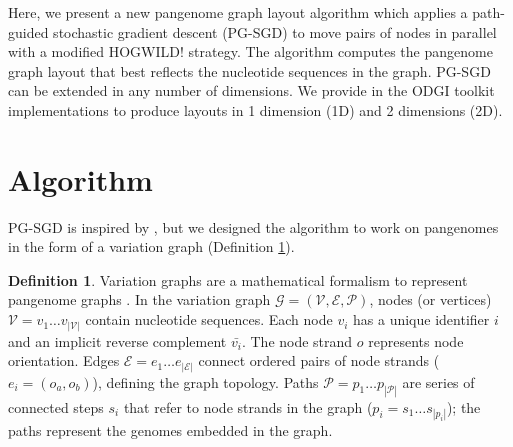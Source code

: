 \documentclass{bioinfo}
\theoremstyle{definition}
\newtheorem{definition}{Definition}[section]
\newcommand{\red}[1]{{\textcolor{Red}{#1}}}
\newcommand{\FIXME}[1]{\red{[FIXME: #1]}}
\begin{document}
	Here, we present a new pangenome graph layout algorithm which applies a path-guided stochastic gradient descent (PG-SGD) to move pairs of nodes in parallel with a modified HOGWILD! strategy.
	The algorithm computes the pangenome graph layout that best reflects the nucleotide sequences in the graph.
	PG-SGD can be extended in any number of dimensions. We provide in the ODGI toolkit \citep{Guarracino2022} implementations to produce layouts in 1 dimension (1D) and 2 dimensions (2D).

	\section{Algorithm}
	
	PG-SGD is inspired by \cite{Zheng2019}, but we designed the algorithm to work on pangenomes in the form of a variation graph (Definition \ref{def:vg}).
	
	\begin{definition}
		\label{def:vg}
		Variation graphs are a mathematical formalism to represent pangenome graphs \citep{Garrison_2019_thesis}.
		In the variation graph $\mathcal{G} = (\mathcal{V}, \mathcal{E}, \mathcal{P})$, nodes (or vertices) $\mathcal{V} = v_1\ldots v_{|\mathcal{V}|}$ contain nucleotide sequences.
		Each node $v_i$ has a unique identifier $i$ and an implicit reverse complement $\bar{v_i}$.
		The node strand $o$ represents node orientation.
		Edges $\mathcal{E} = e_1\ldots e_{|\mathcal{E}|}$ connect ordered pairs of node strands ($e_i = ( o_a, o_b )$), defining the graph topology.
		Paths $\mathcal{P} = p_1\ldots p_{|\mathcal{P}|}$ are series of connected steps $s_i$ that refer to node strands in the graph ($p_i = s_1 \ldots s_{|p_i|}$); the paths represent the genomes embedded in the graph.
	\end{definition}
\end{document}
